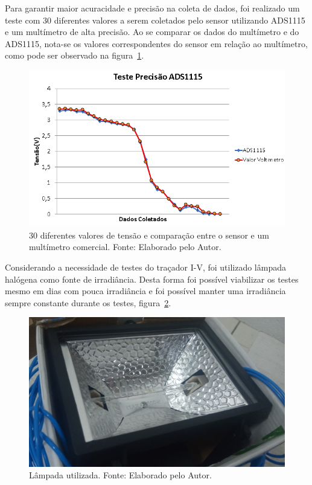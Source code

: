 Para garantir maior acuracidade e precisão na coleta de dados, foi realizado um teste com 30 diferentes valores a serem coletados pelo sensor utilizando ADS1115 e um multímetro de alta precisão. Ao se comparar os dados do multímetro e do ADS1115, nota-se os valores correspondentes do sensor em relação ao multímetro, como pode ser observado na figura~\ref{fig:Precisao}.

\FloatBarrier
\begin{figure}[!htbp]
	\centering
	\includegraphics[scale=1.0]{imagens/Precisao}
	\caption{30 diferentes valores de tensão e comparação entre o sensor e um multímetro comercial. Fonte: Elaborado pelo Autor. 	}
	\label{fig:Precisao}
\end{figure}
\FloatBarrier

Considerando a necessidade de testes do traçador I-V, foi utilizado lâmpada halógena como fonte de irradiância. Desta forma foi possível viabilizar os testes mesmo em dias com pouca irradiância e foi possível manter uma irradiância sempre constante durante os testes, figura~\ref{fig:LampII}.  

\FloatBarrier
\begin{figure}[!htbp]
	\centering
	\includegraphics[scale=0.3]{imagens/LampII.png}
	\caption{Lâmpada utilizada. Fonte: Elaborado pelo Autor. 	}
	\label{fig:LampII}
\end{figure}
\FloatBarrier

